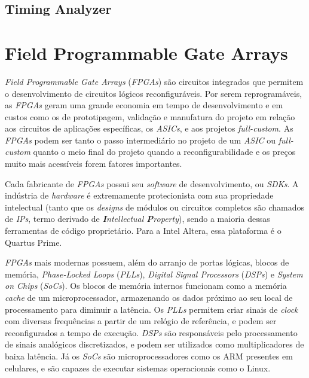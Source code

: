     \subsection{Timing Analyzer}
    {}

\section{Field Programmable Gate Arrays}
{ \textit{Field Programmable Gate Arrays} (\textit{FPGAs}) são circuitos
    integrados que permitem o desenvolvimento de circuitos lógicos
    reconfiguráveis. Por serem reprogramáveis, as \textit{FPGAs} geram uma
    grande economia em tempo de desenvolvimento e em custos como os de
    prototipagem, validação e manufatura do projeto em relação aos circuitos de
    aplicações específicas, os \textit{ASICs}, e aos projetos
    \textit{full-custom}. As \textit{FPGAs} podem ser tanto o passo
    intermediário no projeto de um \textit{ASIC} ou \textit{full-custom} quanto
    o meio final do projeto quando a reconfigurabilidade e os preços muito mais
    acessíveis forem fatores importantes.
}

{ Cada fabricante de \textit{FPGAs} possui seu \textit{software} de
    desenvolvimento, ou \textit{SDKs}. A indústria de \textit{hardware} é
    extremamente protecionista com sua propriedade intelectual (tanto que os
    \textit{designs} de módulos ou circuitos completos são chamados de \textit{IPs},
    termo derivado de \textit{\textbf{I}ntellectual \textbf{P}roperty}), sendo
    a maioria dessas ferramentas de código proprietário. Para a Intel Altera,
    essa plataforma é o Quartus Prime.
}

{ \textit{FPGAs} mais modernas possuem, além do arranjo de portas lógicas,
    blocos de memória, \textit{Phase-Locked Loops} (\textit{PLLs}),
    \textit{Digital Signal Processors} (\textit{DSPs}) e \textit{System on
    Chips} (\textit{SoCs}). Os blocos de memória internos funcionam como a memória
    \textit{cache} de um microprocessador, armazenando os dados próximo ao seu
    local de processamento para diminuir a latência. Os \textit{PLLs} permitem criar
    sinais de \textit{clock} com diversas frequências a partir de um relógio de
    referência, e podem ser reconfigurados a tempo de execução. \textit{DSPs}
    são responsáveis pelo processamento de sinais analógicos discretizados, e
    podem ser utilizados como multiplicadores de baixa latência. Já os
    \textit{SoCs} são microprocessadores como os ARM presentes em celulares,
    e são capazes de executar sistemas operacionais como o Linux.
}

